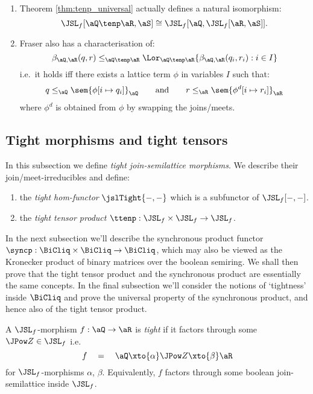 \documentclass{article}
\begin{document}
\begin{note}[Addendum]
  \item
  \begin{enumerate}
  \item
  Theorem \ref{thm:tenp_universal} actually defines a natural isomorphism:
  \[
  \JSL_f[\aQ \tenp \aR,\aS] \cong \JSL_f[\aQ,\JSL_f[\aR,\aS]].
  \]
  
  \item
  Fraser also has a characterisation of:
  \[
  \beta_{\aQ,\aR}(q,r) \leq_{\aQ \tenp \aR} \Lor_{\aQ \tenp \aR} 
  \{ \beta_{\aQ,\aR}(q_i,r_i) : i \in I \}
  \]
  i.e.\ it holds iff there exists a lattice term $\phi$ in variables $I$ such that:
  \[
  q \leq_\aQ \sem{\phi[i \mapsto q_i]}_\aQ
  \qquad\text{and}\qquad
  r \leq_\aR \sem{\phi^d[i \mapsto r_i]}_\aR
  \]
  where $\phi^d$ is obtained from $\phi$ by swapping the joins/meets. \endbox
  \end{enumerate}
\end{note}


\subsection{Tight morphisms and tight tensors}

In this subsection we define \emph{tight join-semilattice morphisms}. We describe their join/meet-irreducibles and define:
\begin{enumerate}
\item
the \emph{tight hom-functor} $\jslTight{-,-}$ which is a subfunctor of $\JSL_f[-,-]$.
\item
the \emph{tight tensor product} $\ttenp : \JSL_f \times \JSL_f \to \JSL_f$.
\end{enumerate}

In the next subsection we'll describe the synchronous product functor $\syncp : \BiCliq \times \BiCliq \to \BiCliq$, which may also be viewed as the Kronecker product of binary matrices over the boolean semiring. We shall then prove that the tight tensor product and the synchronous product are essentially the same concepts. In the final subsection we'll consider the notions of `tightness' inside $\BiCliq$ and prove the universal property of the synchronous product, and hence also of the tight tensor product.


\begin{definition}
\label{def:tight_jsl_mor}
\item
A $\JSL_f$-morphism $f : \aQ \to \aR$ is \emph{tight} if it factors through some $\JPow Z \in \JSL_f$ i.e.\
\[
f \quad = \quad
\aQ \xto{\alpha} \JPow Z \xto{\beta} \aR
\]
for $\JSL_f$-morphisms $\alpha$, $\beta$. Equivalently, $f$ factors through some boolean join-semilattice inside $\JSL_f$. \endbox
\end{definition}
\end{document}
